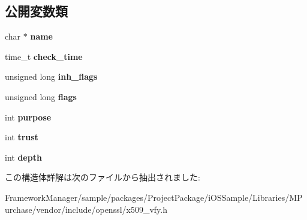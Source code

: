 \subsection*{公開変数類}
\begin{DoxyCompactItemize}
\item 
\hypertarget{struct_x509___v_e_r_i_f_y___p_a_r_a_m__st_a60084caf30e3bddf4fe9264a76441411}{}char $\ast$ {\bfseries name}\label{struct_x509___v_e_r_i_f_y___p_a_r_a_m__st_a60084caf30e3bddf4fe9264a76441411}

\item 
\hypertarget{struct_x509___v_e_r_i_f_y___p_a_r_a_m__st_a2f5100a1ff11cf55b96ddaf802f434d0}{}time\+\_\+t {\bfseries check\+\_\+time}\label{struct_x509___v_e_r_i_f_y___p_a_r_a_m__st_a2f5100a1ff11cf55b96ddaf802f434d0}

\item 
\hypertarget{struct_x509___v_e_r_i_f_y___p_a_r_a_m__st_ae194a37f094a45b53ddd8156c5e2bab1}{}unsigned long {\bfseries inh\+\_\+flags}\label{struct_x509___v_e_r_i_f_y___p_a_r_a_m__st_ae194a37f094a45b53ddd8156c5e2bab1}

\item 
\hypertarget{struct_x509___v_e_r_i_f_y___p_a_r_a_m__st_a3ef03c3f57b0a90d4182a057fe0c8d27}{}unsigned long {\bfseries flags}\label{struct_x509___v_e_r_i_f_y___p_a_r_a_m__st_a3ef03c3f57b0a90d4182a057fe0c8d27}

\item 
\hypertarget{struct_x509___v_e_r_i_f_y___p_a_r_a_m__st_acae8fafa928701889f757951552f5ee9}{}int {\bfseries purpose}\label{struct_x509___v_e_r_i_f_y___p_a_r_a_m__st_acae8fafa928701889f757951552f5ee9}

\item 
\hypertarget{struct_x509___v_e_r_i_f_y___p_a_r_a_m__st_a7b7d5b079ed79cb2399ad471d1b57415}{}int {\bfseries trust}\label{struct_x509___v_e_r_i_f_y___p_a_r_a_m__st_a7b7d5b079ed79cb2399ad471d1b57415}

\item 
\hypertarget{struct_x509___v_e_r_i_f_y___p_a_r_a_m__st_afb5fd48dac56bdbd2e1d9e8e69bfaf23}{}int {\bfseries depth}\label{struct_x509___v_e_r_i_f_y___p_a_r_a_m__st_afb5fd48dac56bdbd2e1d9e8e69bfaf23}

\end{DoxyCompactItemize}


この構造体詳解は次のファイルから抽出されました\+:\begin{DoxyCompactItemize}
\item 
Framework\+Manager/sample/packages/\+Project\+Package/i\+O\+S\+Sample/\+Libraries/\+M\+Purchase/vendor/include/openssl/x509\+\_\+vfy.\+h\end{DoxyCompactItemize}

